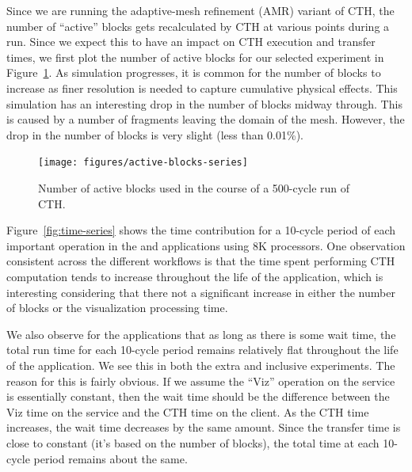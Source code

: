 Since we are running the adaptive-mesh refinement (AMR)
variant of CTH, the number of ``active'' blocks gets
recalculated by CTH at various points during a run. Since we expect this
to have an impact on CTH execution and \intransit transfer times, we first plot
the number of active blocks for our selected experiment in
Figure~\ref{fig:active-blocks}.  As simulation progresses, it is common for
the number of blocks to increase as finer resolution is needed to capture
cumulative physical effects.  This simulation has an interesting drop in
the number of blocks midway through.  This is caused by a number of
fragments leaving the domain of the mesh. 
However, the drop in the number of blocks is very slight (less than
0.01\%).


\begin{figure}[htbp]
\begin{centering}
\texttt{[image: figures/active-blocks-series]}
\caption[Active Blocks]{Number of active blocks used in the course of a
500-cycle run of CTH.}
\label{fig:active-blocks}
\end{centering}
\end{figure}


Figure~\ref{fig:time-series} shows
the time contribution for a 10-cycle period of each important operation in the
\insitu and \intransit applications using 8K processors.  One observation
consistent across the different workflows is that the time spent performing
CTH computation tends to increase throughout the life of the application,
which is interesting considering that there not a significant increase in
either the number of blocks or the visualization processing time.

We also observe for the \intransit applications that as long as there is some
wait time, the total run time for each 10-cycle period remains relatively flat
throughout the life of the application.  We see this in both the \intransit
extra and \intransit inclusive experiments.  The reason for this is fairly
obvious.  If we assume the ``Viz'' operation on the service is essentially
constant, then the wait time should be the difference between the Viz time on
the service and the CTH time on the client.  As the CTH time increases, the
wait time decreases by the same amount.  Since the transfer time is close to
constant (it's based on the number of blocks), the total time at each 10-cycle
period remains about the same.


